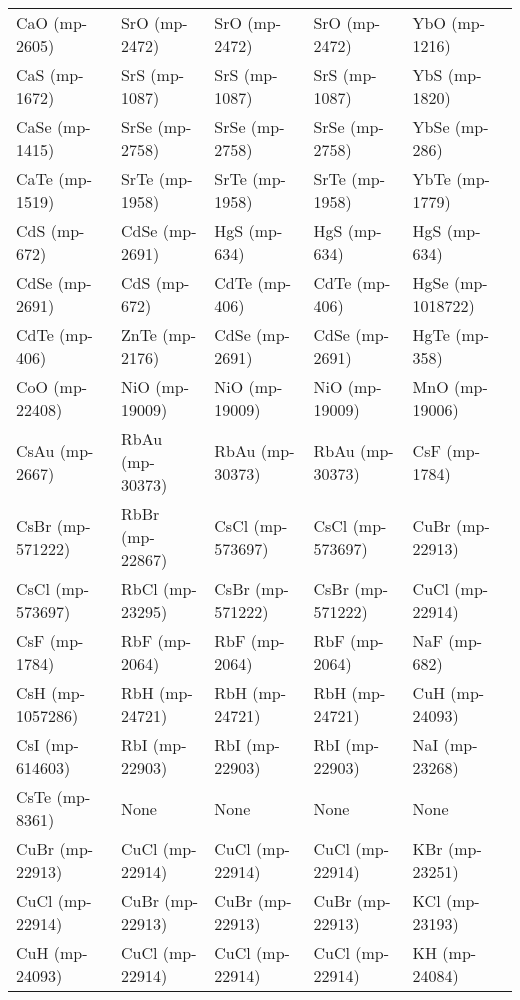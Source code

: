\begin{longtable}{lllll}
    CaO (mp-2605) &     SrO (mp-2472) &       SrO (mp-2472) &     SrO (mp-2472) &       YbO (mp-1216) \\
    CaS (mp-1672) &     SrS (mp-1087) &       SrS (mp-1087) &     SrS (mp-1087) &       YbS (mp-1820) \\
   CaSe (mp-1415) &    SrSe (mp-2758) &      SrSe (mp-2758) &    SrSe (mp-2758) &       YbSe (mp-286) \\
   CaTe (mp-1519) &    SrTe (mp-1958) &      SrTe (mp-1958) &    SrTe (mp-1958) &      YbTe (mp-1779) \\
     CdS (mp-672) &    CdSe (mp-2691) &        HgS (mp-634) &      HgS (mp-634) &        HgS (mp-634) \\
   CdSe (mp-2691) &      CdS (mp-672) &       CdTe (mp-406) &     CdTe (mp-406) &   HgSe (mp-1018722) \\
    CdTe (mp-406) &    ZnTe (mp-2176) &      CdSe (mp-2691) &    CdSe (mp-2691) &       HgTe (mp-358) \\
   CoO (mp-22408) &    NiO (mp-19009) &      NiO (mp-19009) &    NiO (mp-19009) &      MnO (mp-19006) \\
   CsAu (mp-2667) &   RbAu (mp-30373) &     RbAu (mp-30373) &   RbAu (mp-30373) &       CsF (mp-1784) \\
 CsBr (mp-571222) &   RbBr (mp-22867) &    CsCl (mp-573697) &  CsCl (mp-573697) &     CuBr (mp-22913) \\
 CsCl (mp-573697) &   RbCl (mp-23295) &    CsBr (mp-571222) &  CsBr (mp-571222) &     CuCl (mp-22914) \\
    CsF (mp-1784) &     RbF (mp-2064) &       RbF (mp-2064) &     RbF (mp-2064) &        NaF (mp-682) \\
 CsH (mp-1057286) &    RbH (mp-24721) &      RbH (mp-24721) &    RbH (mp-24721) &      CuH (mp-24093) \\
  CsI (mp-614603) &    RbI (mp-22903) &      RbI (mp-22903) &    RbI (mp-22903) &      NaI (mp-23268) \\
   CsTe (mp-8361) &              None &                None &              None &                None \\
  CuBr (mp-22913) &   CuCl (mp-22914) &     CuCl (mp-22914) &   CuCl (mp-22914) &      KBr (mp-23251) \\
  CuCl (mp-22914) &   CuBr (mp-22913) &     CuBr (mp-22913) &   CuBr (mp-22913) &      KCl (mp-23193) \\
   CuH (mp-24093) &   CuCl (mp-22914) &     CuCl (mp-22914) &   CuCl (mp-22914) &       KH (mp-24084) \\

\end{longtable}
